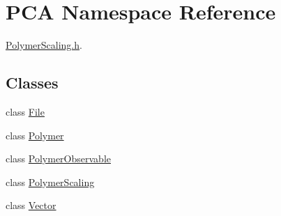 \hypertarget{namespace_p_c_a}{}\section{P\+CA Namespace Reference}
\label{namespace_p_c_a}


\hyperlink{_polymer_scaling_8h}{Polymer\+Scaling.\+h}.  


\subsection*{Classes}
\begin{DoxyCompactItemize}
\item 
class \hyperlink{class_p_c_a_1_1_file}{File}
\item 
class \hyperlink{class_p_c_a_1_1_polymer}{Polymer}
\item 
class \hyperlink{class_p_c_a_1_1_polymer_observable}{Polymer\+Observable}
\item 
class \hyperlink{class_p_c_a_1_1_polymer_scaling}{Polymer\+Scaling}
\item 
class \hyperlink{class_p_c_a_1_1_vector}{Vector}
\end{DoxyCompactItemize}
